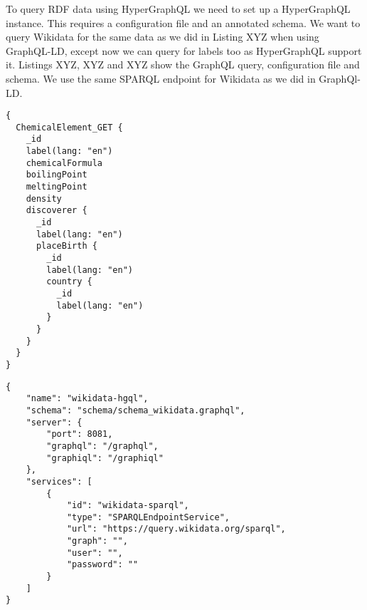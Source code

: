 To query RDF data using HyperGraphQL we need to set up a HyperGraphQL instance. This requires a configuration file and an annotated schema. We want to query Wikidata for the same data as we did in Listing XYZ when using GraphQL-LD, except now we can query for labels too as HyperGraphQL support it. Listings XYZ, XYZ and XYZ show the GraphQL query, configuration file and schema. We use the same SPARQL endpoint for Wikidata as we did in GraphQl-LD.

\begin{minipage}{\linewidth}
\begin{lstlisting}[label=listing:listing29, caption={Query}]
{
  ChemicalElement_GET {
    _id
    label(lang: "en")
    chemicalFormula
    boilingPoint
    meltingPoint
    density
    discoverer {
      _id
      label(lang: "en")
      placeBirth {
        _id
        label(lang: "en")
        country {
          _id
          label(lang: "en")
        }
      }
    }
  }
}
\end{lstlisting}
\end{minipage}

\begin{minipage}{\linewidth}
\begin{lstlisting}[label=listing:listing30, caption={Configuration}]
{
    "name": "wikidata-hgql",
    "schema": "schema/schema_wikidata.graphql",
    "server": {
        "port": 8081,
        "graphql": "/graphql",
        "graphiql": "/graphiql"
    },
    "services": [
        {
            "id": "wikidata-sparql",
            "type": "SPARQLEndpointService",
            "url": "https://query.wikidata.org/sparql",
            "graph": "",
            "user": "",
            "password": ""
        }
    ]
}
\end{lstlisting}
\end{minipage}

